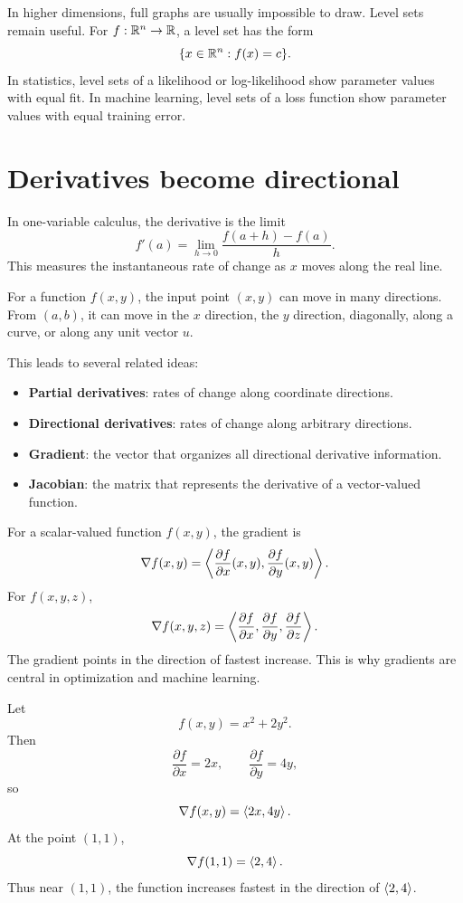 \begin{mainideabox}[title={Why level sets matter}]
In higher dimensions, full graphs are usually impossible to draw. Level sets remain useful. For $f:\mathbb{R}^n\to\mathbb{R}$, a level set has the form
\[
  \{x\in\mathbb{R}^n:f(x)=c\}.
\]
In statistics, level sets of a likelihood or log-likelihood show parameter values with equal fit. In machine learning, level sets of a loss function show parameter values with equal training error.
\end{mainideabox}

\section{Derivatives become directional}

In one-variable calculus, the derivative is the limit
\[
  f'(a)=\lim_{h\to0}\frac{f(a+h)-f(a)}{h}.
\]
This measures the instantaneous rate of change as $x$ moves along the real line.

For a function $f(x,y)$, the input point $(x,y)$ can move in many directions. From $(a,b)$, it can move in the $x$ direction, the $y$ direction, diagonally, along a curve, or along any unit vector $u$.

This leads to several related ideas:
\begin{itemize}
  \item \textbf{Partial derivatives}: rates of change along coordinate directions.
  \item \textbf{Directional derivatives}: rates of change along arbitrary directions.
  \item \textbf{Gradient}: the vector that organizes all directional derivative information.
  \item \textbf{Jacobian}: the matrix that represents the derivative of a vector-valued function.
\end{itemize}

For a scalar-valued function $f(x,y)$, the gradient is
\[
  \nabla f(x,y)=\left\langle \frac{\partial f}{\partial x}(x,y),\frac{\partial f}{\partial y}(x,y)\right\rangle.
\]
For $f(x,y,z)$,
\[
  \nabla f(x,y,z)=\left\langle \frac{\partial f}{\partial x},\frac{\partial f}{\partial y},\frac{\partial f}{\partial z}\right\rangle.
\]
The gradient points in the direction of fastest increase. This is why gradients are central in optimization and machine learning.

\begin{examplebox}[title={A first gradient computation}]
Let
\[
  f(x,y)=x^2+2y^2.
\]
Then
\[
  \frac{\partial f}{\partial x}=2x,
  \qquad
  \frac{\partial f}{\partial y}=4y,
\]
so
\[
  \nabla f(x,y)=\left\langle 2x,4y\right\rangle.
\]
At the point $(1,1)$,
\[
  \nabla f(1,1)=\left\langle 2,4\right\rangle.
\]
Thus near $(1,1)$, the function increases fastest in the direction of $\left\langle 2,4\right\rangle$.
\end{examplebox}

